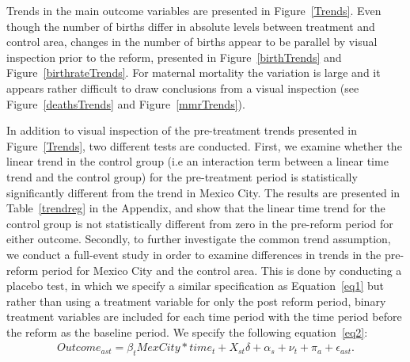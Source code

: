 \documentclass[a4paper, 11pt]{article}
\begin{document}
\begin{spacing}{2}
Trends in the main outcome variables are presented in Figure~\ref{Trends}. Even though the number of births differ in absolute levels between treatment and control area, changes in the number of births appear to be parallel by visual inspection prior to the reform, presented in Figure~\ref{birthTrends} and Figure~\ref{birthrateTrends}. For maternal mortality the variation is large and it appears rather difficult to draw conclusions from a visual inspection (see Figure~\ref{deathsTrends} and Figure~\ref{mmrTrends}). 

In addition to visual inspection of the pre-treatment trends presented in Figure~\ref{Trends}, two different tests are conducted. First, we examine whether the linear trend in the control group (i.e an interaction term between a linear time trend and the control group) for the pre-treatment period is statistically significantly different from the trend in Mexico City. The results are presented in Table~\ref{trendreg} in the Appendix, and show that the linear time trend for the control group is not statistically different from zero in the pre-reform period for either outcome. Secondly, to further investigate the common trend assumption, we conduct a full-event study in order to examine differences in trends in the pre-reform period for Mexico City and the control area. This is done by conducting a placebo test, in which we specify a similar specification as Equation~\ref{eq1} but rather than using a treatment variable for only the post reform period, binary treatment variables are included for each time period with the time period before the reform as the baseline period. We specify the following equation~\ref{eq2}:
\begin{eqnarray}\label{eq2}
  	Outcome_{ast}= \beta_{t} MexCity*time_{t}+	X_{st}\delta +\alpha_{s} + \nu_{t} +\pi_{a} +\epsilon_{ast}.   
\end{eqnarray}

  


\end{spacing}
\end{document}
